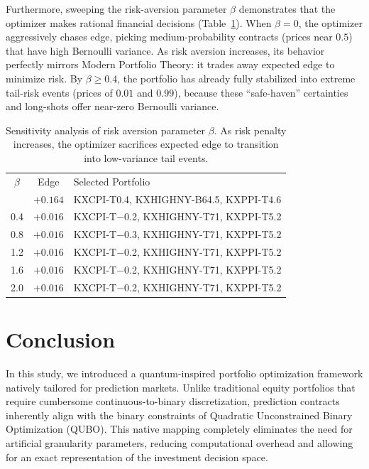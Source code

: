 \documentclass[aps, reprint, prl, twocolumn, superscriptaddress,amsmath,amssymb,noeprint]{revtex4-2}
\begin{document}
Furthermore, sweeping the risk-aversion parameter $\beta$ demonstrates that the optimizer makes rational financial decisions (Table~\ref{tab:sensitivity}). When $\beta = 0$, the optimizer aggressively chases edge, picking medium-probability contracts (prices near $0.5$) that have high Bernoulli variance. As risk aversion increases, its behavior perfectly mirrors Modern Portfolio Theory: it trades away expected edge to minimize risk. By $\beta \ge 0.4$, the portfolio has already fully stabilized into extreme tail-risk events (prices of $0.01$ and $0.99$), because these ``safe-haven'' certainties and long-shots offer near-zero Bernoulli variance.

\begin{table}[h!]
\caption{\label{tab:sensitivity}Sensitivity analysis of risk aversion parameter $\beta$. As risk penalty increases, the optimizer sacrifices expected edge to transition into low-variance tail events.}
\begin{ruledtabular}
\begin{tabular}{ccl}
$\beta$ & Edge & Selected Portfolio \\
\colrule
0.0 & $+0.164$ & KXCPI-T0.4, KXHIGHNY-B64.5, KXPPI-T4.6 \\
0.4 & $+0.016$ & KXCPI-T$-$0.2, KXHIGHNY-T71, KXPPI-T5.2 \\
0.8 & $+0.016$ & KXCPI-T$-$0.3, KXHIGHNY-T71, KXPPI-T5.2 \\
1.2 & $+0.016$ & KXCPI-T$-$0.2, KXHIGHNY-T71, KXPPI-T5.2 \\
1.6 & $+0.016$ & KXCPI-T$-$0.2, KXHIGHNY-T71, KXPPI-T5.2 \\
2.0 & $+0.016$ & KXCPI-T$-$0.2, KXHIGHNY-T71, KXPPI-T5.2 \\
\end{tabular}
\end{ruledtabular}
\end{table}





\section{Conclusion}


In this study, we introduced a quantum-inspired portfolio optimization framework natively tailored for prediction markets. Unlike traditional equity portfolios that require cumbersome continuous-to-binary discretization, prediction contracts inherently align with the binary constraints of Quadratic Unconstrained Binary Optimization (QUBO). This native mapping completely eliminates the need for artificial granularity parameters, reducing computational overhead and allowing for an exact representation of the investment decision space.
\end{document}

